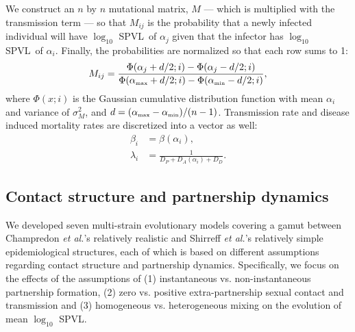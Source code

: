 \documentclass[10pt,letterpaper]{article}
\newcommand{\Lspvl}{$\log_{10}$ SPVL}
\newcommand{\etal}{\textit{et al.}}
\newcommand{\tsub}[2]{#1_{{\textrm{\tiny #2}}}}
\begin{document}
We construct an $n$ by $n$ mutational matrix, $M$ --- which is multiplied with the transmission term ---  so that $M_{ij}$ is the probability that a newly infected individual will have \Lspvl\ of $\alpha_j$ given that the infector has \Lspvl\ of $\alpha_i$. Finally, the probabilities are normalized so that each row sums to 1:
\begin{equation}
M_{ij} = \frac{\Phi(\alpha_j + d/2;i) - \Phi(\alpha_j - d/2;i)}{\Phi(\tsub{\alpha}{max} + d/2;i) - \Phi(\tsub{\alpha}{min} - d/2;i)},
\end{equation}
where $\Phi(x;i)$ is the Gaussian cumulative distribution function with mean $\alpha_i$ and variance of $\sigma_M^2$, and $d = (\tsub{\alpha}{max} - \tsub{\alpha}{min})/(n-1)$. Transmission rate and disease induced mortality rates are discretized into a vector as well:
\begin{equation}
\begin{aligned}
\beta_i &= \beta(\alpha_i),\\
\lambda_i &= \frac{1}{D_P + D_A (\alpha_i) + D_D}.
\end{aligned}
\end{equation}

\subsection*{Contact structure and partnership dynamics}

We developed seven multi-strain evolutionary models covering a gamut between Champredon \etal's relatively realistic \cite{champredon_hiv_2013} and Shirreff \etal's relatively simple \cite{shirreff_transmission_2011} epidemiological structures, each of which is based on different assumptions regarding contact structure and partnership dynamics. Specifically, we focus on the effects of the assumptions of (1) instantaneous vs. non-instantaneous partnership formation, (2) zero vs. positive extra-partnership sexual contact and transmission and (3) homogeneous vs. heterogeneous mixing on the evolution of mean \Lspvl.
\end{document}

